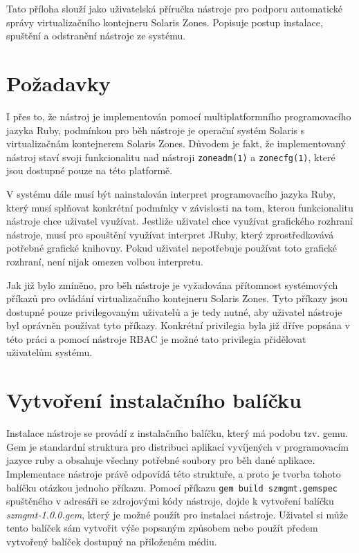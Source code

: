 \label{appendix:installation}
Tato příloha slouží jako uživatelská příručka nástroje pro podporu automatické správy virtualizačního kontejneru Solaris Zones.
Popisuje postup instalace, spuštění a odstranění nástroje ze systému.
\section{Požadavky}
\label{appendix:installation:demands}
I přes to, že nástroj je implementován pomocí multiplatformního programovacího jazyka Ruby, podmínkou pro běh nástroje je operační
systém Solaris s virtualizačnám kontejnerem Solaris Zones. Důvodem je fakt, že implementovaný nástroj staví svoji funkcionalitu
nad nástroji \texttt{zoneadm(1)} a \texttt{zonecfg(1)}, které jsou dostupné pouze na této platformě.

V systému dále musí být nainstalován interpret programovacího jazyka Ruby, který musí splňovat konkrétní podmínky v závislosti na tom,
kterou funkcionalitu nástroje chce uživatel využívat. Jestliže uživatel chce využívat grafického rozhraní nástroje, musí pro
spouštění využívat interpret JRuby, který zprostředkovává potřebné grafické knihovny. Pokud uživatel nepotřebuje používat
toto grafické rozhraní, není nijak omezen volbou interpretu.

Jak již bylo zmíněno, pro běh nástroje je vyžadována přítomnost systémových příkazů pro ovládání virtualizačního kontejneru Solaris
Zones. Tyto příkazy jsou dostupné pouze privilegovaným uživatelů a je tedy nutné, aby uživatel nástroje byl oprávněn používat 
tyto příkazy. Konkrétní privilegia byla již dříve popsána v této práci a pomocí nástroje RBAC je možné tato privilegia přidělovat
uživatelům systému.
\section{Vytvoření instalačního balíčku}
\label{appendix:installation:package}
Instalace nástroje se provádí z instalačního balíčku, který má podobu tzv. gemu. Gem je standardní struktura pro distribuci aplikací
vyvíjených v programovacím jazyce ruby a obsahuje všechny potřebné soubory pro běh dané aplikace. Implementace nástroje právě
odpovídá této struktuře, a proto je tvorba tohoto balíčku otázkou jednoho příkazu. Pomocí příkazu \texttt{gem build szmgmt.gemspec}
spuštěného v adresáři se zdrojovými kódy nástroje, dojde k vytvoření balíčku \textit{szmgmt-1.0.0.gem}, který je možné použít
pro instalaci nástroje. Uživatel si může tento balíček sám vytvořit výše popsaným způsobem nebo použít předem vytvořený balíček 
dostupný na přiloženém médiu.
